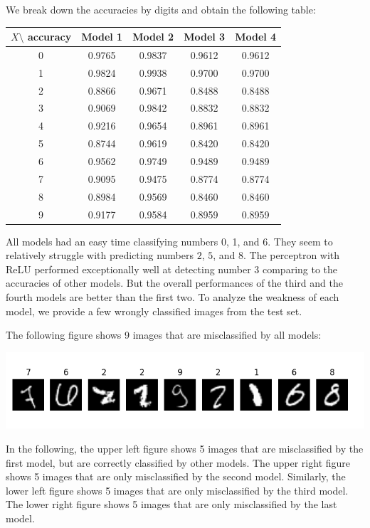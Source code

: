 \documentclass[11pt]{amsart}
\begin{document}
We break down the accuracies by digits and obtain the following table:
\begin{center}
\bgroup
\def\arraystretch{1.2}
\begin{tabular}{|c|c|c|c|c|}
\hline
$X\setminus$ accuracy & Model 1 & Model 2 & Model 3 & Model 4 \\
\hline
0 & 0.9765 & 0.9837 & 0.9612 & 0.9612 \\
\hline
1 & 0.9824 & 0.9938 & 0.9700 & 0.9700 \\
\hline
2 & 0.8866 & 0.9671 & 0.8488 & 0.8488 \\
\hline
3 & 0.9069 & 0.9842 & 0.8832 & 0.8832 \\
\hline
4 & 0.9216 & 0.9654 & 0.8961 & 0.8961 \\
\hline
5 & 0.8744 & 0.9619 & 0.8420 & 0.8420 \\
\hline
6 & 0.9562 & 0.9749 & 0.9489 & 0.9489 \\
\hline
7 & 0.9095 & 0.9475 & 0.8774 & 0.8774 \\
\hline
8 & 0.8984 & 0.9569 & 0.8460 & 0.8460 \\
\hline
9 & 0.9177 & 0.9584 & 0.8959 & 0.8959 \\
\hline
\end{tabular}
\egroup
\end{center}
\medskip

All models had an easy time classifying numbers 0, 1, and 6. They seem to relatively struggle with predicting numbers $2$, $5$, and $8$. The perceptron with ReLU performed exceptionally well at detecting number 3 comparing to the accuracies of other models. But the overall performances of the third and the fourth models are better than the first two.
To analyze the weakness of each model, we provide a few wrongly classified images from the test set.

The following figure shows 9 images that are misclassified by all models:

\begin{minipage}{0.8\linewidth}
\includegraphics[width = \linewidth]{W.png}
\end{minipage}

In the following, the upper left figure shows 5 images that are misclassified by the first model, but are correctly classified by other models. The upper right figure shows 5 images that are only misclassified by the second model. Similarly, the lower left figure shows 5 images that are only misclassified by the third model. The lower right figure shows 5 images that are only misclassified by the last model.
\end{document}
